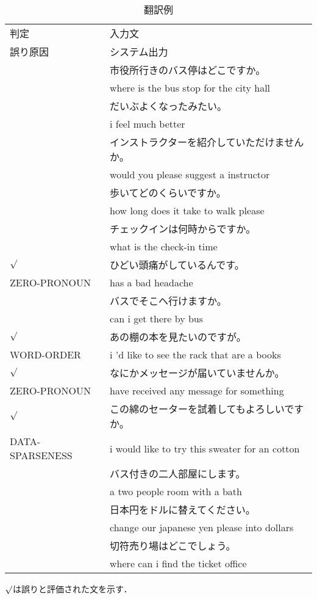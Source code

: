\begin{table}
\caption{翻訳例}
\begin{center}
\label{翻訳例}
\begin{tabular}{ll}
\hline
判定     & 入力文         \\
誤り原因 & システム出力 \\
\hline
\hline
 & 市役所行きのバス停はどこですか。         \\
 & where is the bus stop for the city hall  \\
\hline
 & だいぶよくなったみたい。 \\
 & i feel much better \\
\hline
 & インストラクターを紹介していただけませんか。\\
 & would you please suggest a instructor\\
\hline
 & 歩いてどのくらいですか。\\
 & how long does it take to walk please\\
\hline
 & チェックインは何時からですか。\\
 & what is the check-in time     \\
\hline
$\surd$ & ひどい頭痛がしているんです。\\
ZERO-PRONOUN       & has a bad headache\\
\hline
 & バスでそこへ行けますか。\\
 & can i get there by bus\\
\hline
$\surd$ &あの棚の本を見たいのですが。\\
WORD-ORDER &i 'd like to see the rack that are a books\\
\hline
$\surd$ &なにかメッセージが届いていませんか。\\
ZERO-PRONOUN &have received any message for something\\
\hline
$\surd$ &この綿のセーターを試着してもよろしいですか。\\
DATA-SPARSENESS &i would like to try this sweater for an cotton\\
\hline
 & バス付きの二人部屋にします。\\
 & a two people room with a bath\\
\hline
 & 日本円をドルに替えてください。\\
 & change our japanese yen please into dollars\\
\hline
 & 切符売り場はどこでしょう。\\
 & where can i find the ticket office\\
\hline
\end{tabular}
\end{center}
{\footnotesize * $\surd$は誤りと評価された文を示す．}
\end{table}

